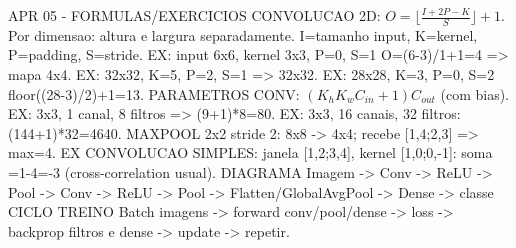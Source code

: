 APR 05 - FORMULAS/EXERCICIOS
CONVOLUCAO 2D:
$O=\lfloor\frac{I+2P-K}{S}\rfloor+1$.
Por dimensao: altura e largura separadamente.
I=tamanho input, K=kernel, P=padding, S=stride.
EX: input 6x6, kernel 3x3, P=0, S=1
O=(6-3)/1+1=4 => mapa 4x4.
EX: 32x32, K=5, P=2, S=1 => 32x32.
EX: 28x28, K=3, P=0, S=2
floor((28-3)/2)+1=13.
PARAMETROS CONV:
$(K_hK_wC_{in}+1)C_{out}$ (com bias).
EX: 3x3, 1 canal, 8 filtros => (9+1)*8=80.
EX: 3x3, 16 canais, 32 filtros:
(144+1)*32=4640.
MAXPOOL 2x2 stride 2: 8x8 -> 4x4;
recebe [1,4;2,3] => max=4.
EX CONVOLUCAO SIMPLES:
janela [1,2;3,4], kernel [1,0;0,-1]:
soma =1-4=-3 (cross-correlation usual).
DIAGRAMA
Imagem -> Conv -> ReLU -> Pool
        -> Conv -> ReLU -> Pool
        -> Flatten/GlobalAvgPool -> Dense -> classe
CICLO TREINO
Batch imagens -> forward conv/pool/dense
 -> loss -> backprop filtros e dense
 -> update -> repetir.